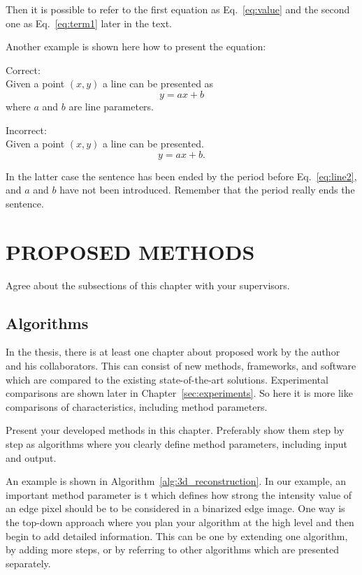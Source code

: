 \documentclass{lutmscthesis}[2017/10/03]
\begin{document}
Then it is possible to refer to the first equation as Eq.~\ref{eq:value} and the second one as Eq.~\ref{eq:term1} later in the text. 

Another example is shown here how to present the equation: 

Correct:\\
Given a point $(x,y)$ a line can be presented as 
\begin{equation}
y = ax + b
\label{eq:line1}
\end{equation}
where $a$ and $b$ are line parameters. 

Incorrect:\\ 
Given a point $(x,y)$ a line can be presented.  
\begin{equation}
y = ax + b.
\label{eq:line2}
\end{equation}

In the latter case  the sentence has been ended by the period before Eq.~\ref{eq:line2}, 
and $a$ and $b$ have not been introduced. 
Remember that the period really ends the sentence. 

\section{PROPOSED METHODS}
\label{sec:proposed}

Agree about the subsections of this chapter with your supervisors.

\subsection{Algorithms}

In the thesis, there is at least one chapter about proposed work by the author and his collaborators. 
This can consist of new methods, frameworks, and software which are compared to the existing state-of-the-art solutions. 
Experimental comparisons are shown later in Chapter~\ref{sec:experiments}.
So here it is more like comparisons of characteristics, including method parameters. 

Present your developed methods in this chapter. 
Preferably show them step by step as algorithms where you clearly define method parameters, including input and output. 

An example is shown in Algorithm~\ref{alg:3d_reconstruction}. 
In our example, an important method parameter is t which defines 
how strong the intensity value of an edge pixel should be to be considered in a binarized edge image. 
One way is the top-down approach where you plan your algorithm at the high level and then begin to add detailed information. 
This can be one by extending one algorithm, by adding more steps, or by referring to other algorithms which are presented separately. 
\end{document}
